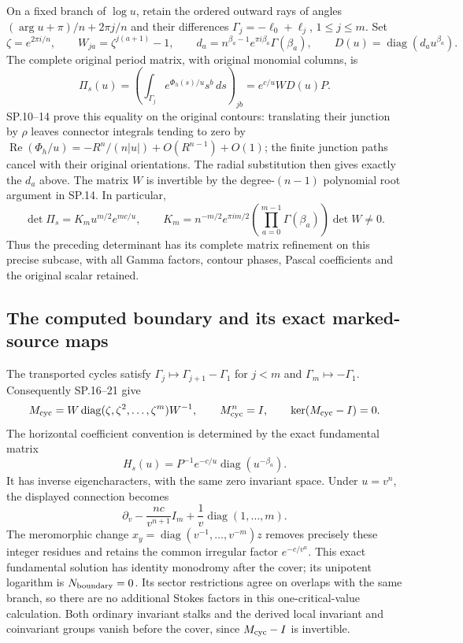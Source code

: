 On a fixed branch of \(\log u\), retain the ordered outward rays of
angles \((\arg u+\pi)/n+2\pi j/n\) and their differences
\(\Gamma_j=-\ell_0+\ell_j\), \(1\leq j\leq m\).
Set
\[
 \zeta=e^{2\pi i/n},\qquad
 W_{ja}=\zeta^{j(a+1)}-1,\qquad
 d_a=n^{\beta_a-1}e^{\pi i\beta_a}\Gamma(\beta_a),\qquad
 D(u)=\operatorname{diag}(d_a u^{\beta_a}).
\]
The complete original period matrix, with original monomial columns,
is
\[
 \Pi_s(u)=\left(\int_{\Gamma_j}e^{\Phi_h(s)/u}s^b\,ds\right)_{jb}
         =e^{c/u}W D(u)P .
\]
SP.10--14 prove this equality on the original contours: translating
their junction by \(\rho\) leaves connector integrals tending to zero
by
\(\operatorname{Re}(\Phi_h/u)
=-R^n/(n|u|)+O(R^{n-1})+O(1)\); the finite junction paths cancel with
their original orientations.  The radial substitution then gives
exactly the \(d_a\) above.  The matrix \(W\) is invertible by the
degree-\((n-1)\) polynomial root argument in SP.14.  In particular,
\[
 \det\Pi_s
 =K_m u^{m/2}e^{mc/u},\qquad
 K_m=n^{-m/2}e^{\pi im/2}
       \left(\prod_{a=0}^{m-1}\Gamma(\beta_a)\right)\det W\ne0 .
\]
Thus the preceding determinant has its complete matrix refinement
on this precise subcase, with all Gamma factors, contour phases,
Pascal coefficients and the original scalar retained.

\subsection{The computed boundary and its exact marked-source maps}

The transported cycles satisfy
\(\Gamma_j\mapsto\Gamma_{j+1}-\Gamma_1\) for \(j<m\) and
\(\Gamma_m\mapsto-\Gamma_1\).  Consequently SP.16--21 give
\[
 M_{\rm cyc}
 =W\operatorname{diag}(\zeta,\zeta^2,\ldots,\zeta^m)W^{-1},
 \qquad M_{\rm cyc}^n=I,\qquad
 \ker(M_{\rm cyc}-I)=0 .
\]
The horizontal coefficient convention is determined by the exact
fundamental matrix
\[
 H_s(u)=P^{-1}e^{-c/u}\operatorname{diag}(u^{-\beta_a}).
\]
It has inverse eigencharacters, with the same zero invariant space.
Under \(u=v^n\), the displayed connection becomes
\[
 \partial_v-\frac{nc}{v^{n+1}}I_m
     +\frac1v\operatorname{diag}(1,\ldots,m).
\]
The meromorphic change
\(x_y=\operatorname{diag}(v^{-1},\ldots,v^{-m})z\)
removes precisely these integer residues and retains the common
irregular factor \(e^{-c/v^n}\).  This exact fundamental solution
has identity monodromy after the cover; its unipotent logarithm is
\(N_{\rm boundary}=0\).  Its sector restrictions agree on overlaps
with the same branch, so there are no additional Stokes factors in
this one-critical-value calculation.  Both ordinary invariant
stalks and the derived local invariant and coinvariant groups vanish
before the cover, since \(M_{\rm cyc}-I\) is invertible.

